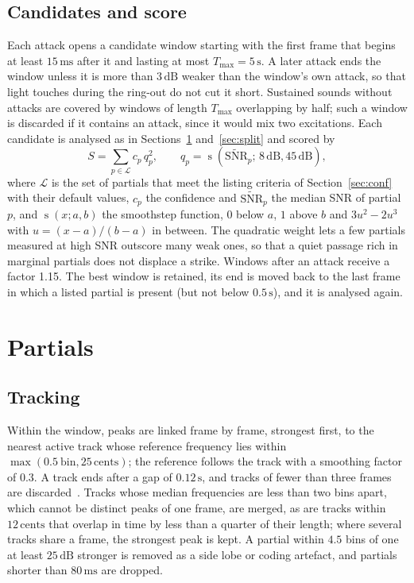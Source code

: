 \documentclass[10pt,a4paper,twocolumn]{article}
\newcommand{\dB}{\,\mathrm{dB}}
\newcommand{\s}{\,\mathrm{s}}
\newcommand{\ms}{\,\mathrm{ms}}
\newcommand{\ct}{\,\mathrm{cents}}
\newcommand{\sst}{\operatorname{s}}
\begin{document}
\subsection{Candidates and score}

Each attack opens a candidate window starting with the first frame that begins at least $15\ms$ after it and lasting at most $T_{\max} = 5\s$. A later attack ends the window unless it is more than $3\dB$ weaker than the window's own attack, so that light touches during the ring-out do not cut it short. Sustained sounds without attacks are covered by windows of length $T_{\max}$ overlapping by half; such a window is discarded if it contains an attack, since it would mix two excitations. Each candidate is analysed as in Sections~\ref{sec:partials} and~\ref{sec:split} and scored by
\begin{equation}
S = \sum_{p \in \mathcal{L}} c_p\, q_p^2,\qquad q_p = \sst(\widetilde{\mathrm{SNR}}_p;\, 8\dB, 45\dB),
\label{eq:score}
\end{equation}
where $\mathcal{L}$ is the set of partials that meet the listing criteria of Section~\ref{sec:conf} with their default values, $c_p$ the confidence and $\widetilde{\mathrm{SNR}}_p$ the median SNR of partial $p$, and $\sst(x;a,b)$ the smoothstep function, $0$ below $a$, $1$ above $b$ and $3u^2-2u^3$ with $u = (x-a)/(b-a)$ in between. The quadratic weight lets a few partials measured at high SNR outscore many weak ones, so that a quiet passage rich in marginal partials does not displace a strike. Windows after an attack receive a factor 1.15. The best window is retained, its end is moved back to the last frame in which a listed partial is present (but not below $0.5\s$), and it is analysed again.

\section{Partials}
\label{sec:partials}

\subsection{Tracking}

Within the window, peaks are linked frame by frame, strongest first, to the nearest active track whose reference frequency lies within $\max(0.5\ \text{bin}, 25\ct)$; the reference follows the track with a smoothing factor of $0.3$. A track ends after a gap of $0.12\s$, and tracks of fewer than three frames are discarded~\cite{McAulay,SMS}. Tracks whose median frequencies are less than two bins apart, which cannot be distinct peaks of one frame, are merged, as are tracks within $12\ct$ that overlap in time by less than a quarter of their length; where several tracks share a frame, the strongest peak is kept. A partial within $4.5$ bins of one at least $25\dB$ stronger is removed as a side lobe or coding artefact, and partials shorter than $80\ms$ are dropped.
\end{document}
